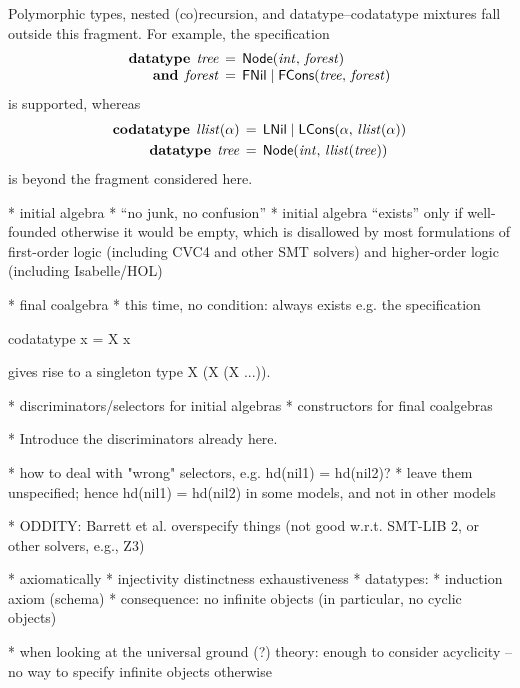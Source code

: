 \documentclass[a4paper,oribibl,envcountsame,draft]{llncs}
\begin{document}
Polymorphic types, nested (co)recursion, and datatype--codatatype mixtures fall
outside this fragment. For example, the specification
\[\begin{aligned}[t]
      \textbf{datatype}\;\, \mathit{tree} & \,=\, \textsf{Node}(\mathit{int},\, \mathit{forest}) \\[-\jot]
      \textbf{and}\;\, \mathit{forest} & \,=\, \textsf{FNil} \mid \textsf{FCons}(\mathit{tree},\, \mathit{forest})
\end{aligned}
\]
is supported, whereas
\[\begin{aligned}[t]
      \textbf{codatatype}\; \,\mathit{llist}(\alpha) & \,=\, \textsf{LNil} \mid \textsf{LCons}(\alpha,\, \mathit{llist}(\alpha)) \\
      \textbf{datatype}\;\, \mathit{tree} & \,=\, \textsf{Node}(\mathit{int},\, \mathit{llist}(\mathit{tree}))
\end{aligned}
\]
is beyond the fragment considered here.


  * initial algebra
    * ``no junk, no confusion''
    * initial algebra ``exists'' only if well-founded
      otherwise it would be empty, which is disallowed by most formulations of
      first-order logic (including CVC4 and other SMT solvers)
      and higher-order logic (including Isabelle/HOL)

  * final coalgebra
    * this time, no condition: always exists
    e.g. the specification

      codatatype x = X x

    gives rise to a singleton type {X (X (X ...))}.

  * discriminators/selectors for initial algebras
  * constructors for final coalgebras

  * Introduce the discriminators already here.

  * how to deal with "wrong" selectors, e.g.
        hd(nil1) = hd(nil2)?
      * leave them unspecified; hence hd(nil1) = hd(nil2) in some models,
        and not in other models

  * ODDITY: Barrett et al. overspecify things (not good w.r.t. SMT-LIB 2, or
    other solvers, e.g., Z3)

  * axiomatically
    * injectivity
      distinctness
      exhaustiveness
    * datatypes:
      * induction axiom (schema)
        * consequence: no infinite objects (in particular, no cyclic objects)

      * when looking at the universal ground (?) theory:
        enough to consider acyclicity -- no way to specify infinite objects
        otherwise
\end{document}
